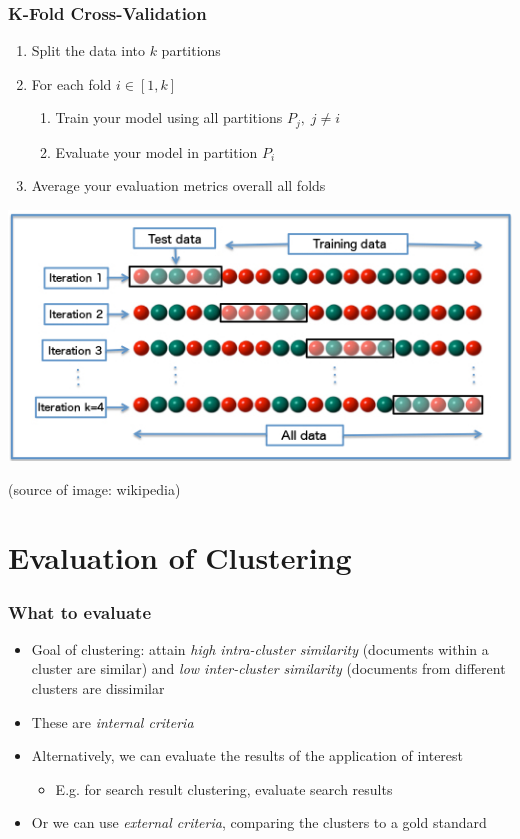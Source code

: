 \documentclass[svgnames]{beamer}
\begin{document}
\begin{frame}
    \frametitle{K-Fold Cross-Validation}
    \begin{enumerate}
    \item Split the data into $k$ partitions
    \item For each fold $i \in [1,k]$
        \begin{enumerate}
        \item Train your model using all partitions $P_j,\; j \neq i$
        \item Evaluate your model in partition $P_i$
        \end{enumerate}
    \item Average your evaluation metrics overall all folds
    \end{enumerate}
    \begin{center}
        \includegraphics[width=0.8 \textwidth]{K-fold_cross_validation_EN}
    \end{center}
    \tiny\raggedleft(source of image: wikipedia)
\end{frame}


\section{Evaluation of Clustering}

\begin{frame}
    \frametitle{What to evaluate}
    \begin{itemize}
    \item Goal of clustering: attain \emph{high intra-cluster similarity}
        (documents within a cluster are similar) and \emph{low inter-cluster
          similarity} (documents from different clusters are dissimilar
    \item These are \emph{internal criteria}
    \item Alternatively, we can evaluate the results of the application
        of interest
        \begin{itemize}
        \item E.g. for search result clustering, evaluate search results
        \end{itemize}
    \item Or we can use \emph{external criteria}, comparing the clusters to a
        gold standard
    \end{itemize}
\end{frame}
\end{document}
